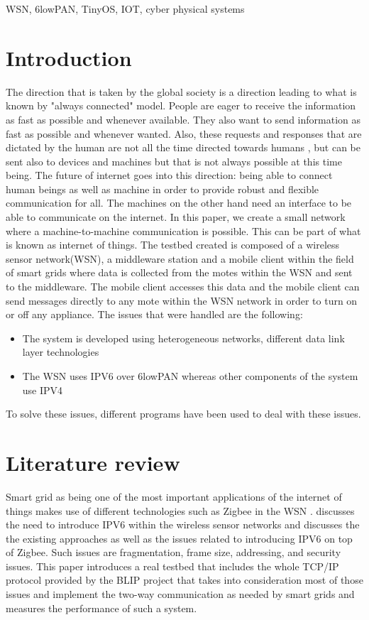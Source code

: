 \documentclass[conference]{IEEEtran}
\begin{document}
\begin{IEEEkeywords}
WSN, 6lowPAN, TinyOS, IOT, cyber physical systems
\end{IEEEkeywords}

\section{Introduction}
The direction that is taken by the global society is a direction leading to what is known by "always connected" model. People are eager to receive the information as fast as possible and whenever available. They also want to send information as fast as possible and whenever wanted. Also, these requests and responses that are dictated by the human are not all the time directed towards humans , but can be sent also to devices and machines but that is not always possible at this time being. The future  of internet goes into this direction: being able to connect human beings as well as machine in order to provide robust and flexible communication for all. The machines on the other hand need an interface to be able to communicate on the internet. In this paper, we create a small network where a machine-to-machine communication is possible. This can be part of what is known as internet of things. The testbed created is composed of a wireless sensor network(WSN), a middleware station and a mobile client within the field of smart grids where data is collected from the motes within the WSN and sent to the middleware. The mobile client accesses this data and the mobile client can send messages directly to any mote within the WSN network in order to turn on or off any appliance. The issues that were handled are the following:
\begin{itemize}
\item The system is developed using heterogeneous networks, different data link layer technologies
\item The WSN uses IPV6 over 6lowPAN whereas other components of the system use IPV4
\end{itemize}
To solve these issues, different programs have been used to deal with these issues. 
 
\section{Literature review}
Smart grid as being one of the most important applications of the internet of things makes use of different technologies such as Zigbee in the WSN \cite{ref1}.  \cite{ref2} discusses the need to introduce IPV6 within the wireless sensor networks and discusses the the existing approaches as well as the issues related to introducing IPV6 on top of Zigbee. Such issues are fragmentation, frame size, addressing, and security issues. This paper introduces a real testbed that includes the whole TCP/IP protocol provided by the BLIP project that takes into consideration most of those issues and implement the two-way communication as needed by smart grids and measures the performance of such a system. 
\end{document}
